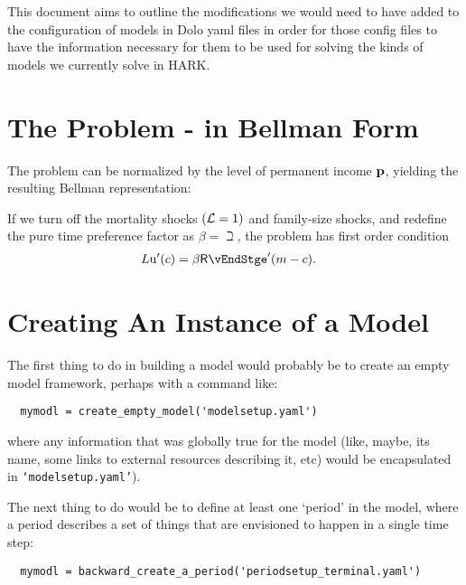 \documentclass[SolvingMicroDSOPs]{subfiles}
\begin{document}

This document aims to outline the modifications we would need to have added to the configuration of models in Dolo yaml files in order for those config files to have the information necessary for them to be used for solving the kinds of models we currently solve in HARK.

\section{The Problem - in Bellman Form}





The problem can be normalized by the level of permanent income $\mathbf{p}$, yielding the resulting Bellman representation:






If we turn off the mortality shocks $(\mathcal{L}=1)$ and family-size shocks, and redefine the pure time preference factor as $\beta=\beth$, the problem has first order condition
\begin{align}
L   \uFunc^{\prime}(\cNrm) & = \DiscFac \Rfree \vEndStge^{\prime}(\mNrm - \cNrm).  \label{eq:FOCstep}
\end{align}

\section{Creating An Instance of a Model}

The first thing to do in building a model would probably be to create an empty model framework, perhaps with a command like:
\begin{verbatim}
  mymodl = create_empty_model('modelsetup.yaml')
\end{verbatim}
where any information that was globally true for the model (like, maybe, its name, some links to external resources describing it, etc) would be encapsulated in \texttt{`modelsetup.yaml'}).

The next thing to do would be to define at least one `period' in the model, where a period describes a set of things that are envisioned to happen in a single time step:
\begin{verbatim}
  mymodl = backward_create_a_period('periodsetup_terminal.yaml')
\end{verbatim}
\end{document}
